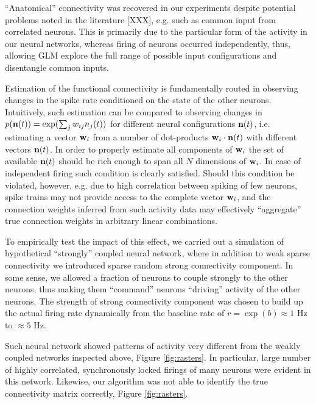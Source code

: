 ``Anatomical'' connectivity was recovered in our experiments despite potential problems noted in the literature [XXX], e.g. such as common input from correlated neurons. This is primarily due to the particular form of the activity in our neural networks, whereas firing of neurons occurred independently, thus, allowing GLM explore the full range of possible input configurations and disentangle common inputs.

Estimation of the functional connectivity is fundamentally routed in observing changes in the spike rate conditioned on the state of the other neurons. Intuitively, such estimation can be compared to observing changes in $p({\bf n}(t))=\exp(\sum_j w_{ij}n_j(t))$ for different neural configurations ${\bf n}(t)$, i.e. estimating a vector ${\bf w}_i$ from a number of dot-products ${\bf w}_i\cdot {\bf n}(t)$ with different vectors ${\bf n}(t)$. In order to properly estimate all components of ${\bf w}_i$ the set of available ${\bf n}(t)$ should be rich enough to span all $N$ dimensions of ${\bf w}_i$. In case of independent firing such condition is clearly satisfied.  Should this condition be violated, however, e.g. due to high correlation between spiking of few neurons, spike trains may not provide access to the complete vector ${\bf w}_i$, and the connection weights inferred from such activity data may effectively ``aggregate'' true connection weights in arbitrary linear combinations.

To empirically test the impact of this effect, we carried out a simulation of hypothetical ``strongly'' coupled  neural network, where in addition to weak sparse connectivity we introduced sparse random strong connectivity component. In some sense, we allowed a fraction of neurons to couple strongly to the other neurons, thus making them ``command'' neurons ``driving'' activity of the other neurons. The strength of strong connectivity component was chosen to build up the actual firing rate dynamically from the baseline rate of $r=\exp(b)\approx 1$ Hz to $\approx 5$  Hz.

Such neural network showed patterns of activity very different from the weakly coupled networks inspected above, Figure \ref{fig:rasters}.  In particular, large number of highly correlated, synchronously locked firings of many neurons were evident in this network.  Likewise, our algorithm was not able to identify the true connectivity matrix correctly, Figure \ref{fig:rasters}.

%
%



